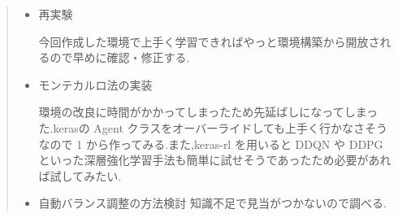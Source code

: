 \documentclass{jarticle}     %
\begin{document}
\begin{quote}
  \begin{itemize}
    \item 再実験
    \par
    今回作成した環境で上手く学習できればやっと環境構築から開放されるので早めに確認・修正する.
   \item モンテカルロ法の実装
   \par
   環境の改良に時間がかかってしまったため先延ばしになってしまった.kerasの Agent クラスをオーバーライドしても上手く行かなさそうなので 1 から作ってみる.また,keras-rl を用いると DDQN や DDPG といった深層強化学習手法も簡単に試せそうであったため必要があれば試してみたい\cite{Document}.

   \item 自動バランス調整の方法検討
   知識不足で見当がつかないので調べる.
   
  \end{itemize}
 \end{quote}



\end{document}
